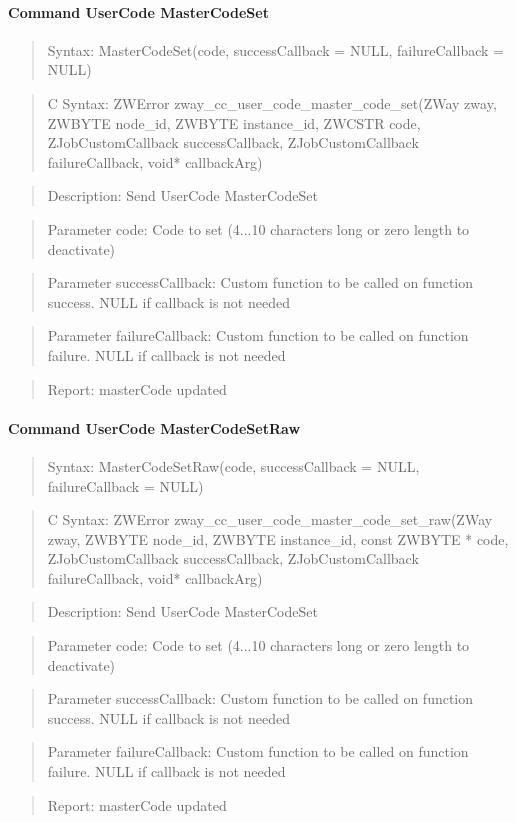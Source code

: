 \paragraph{Command UserCode MasterCodeSet}
\begin{quote}Syntax: MasterCodeSet(code, successCallback = NULL, failureCallback = NULL)\end{quote}
\begin{quote}C Syntax: ZWError zway\_cc\_user\_code\_master\_code\_set(ZWay zway, ZWBYTE node\_id, ZWBYTE instance\_id, ZWCSTR code, ZJobCustomCallback successCallback, ZJobCustomCallback failureCallback, void* callbackArg)\end{quote}
\begin{quote}Description: Send UserCode MasterCodeSet\end{quote}
\begin{quote}Parameter code: Code to set (4...10 characters long or zero length to deactivate)\end{quote}
\begin{quote}Parameter successCallback: Custom function to be called on function success. NULL if callback is not needed\end{quote}
\begin{quote}Parameter failureCallback: Custom function to be called on function failure. NULL if callback is not needed\end{quote}
\begin{quote}Report: masterCode updated\end{quote}

\paragraph{Command UserCode MasterCodeSetRaw}
\begin{quote}Syntax: MasterCodeSetRaw(code, successCallback = NULL, failureCallback = NULL)\end{quote}
\begin{quote}C Syntax: ZWError zway\_cc\_user\_code\_master\_code\_set\_raw(ZWay zway, ZWBYTE node\_id, ZWBYTE instance\_id, const ZWBYTE * code, ZJobCustomCallback successCallback, ZJobCustomCallback failureCallback, void* callbackArg)\end{quote}
\begin{quote}Description: Send UserCode MasterCodeSet\end{quote}
\begin{quote}Parameter code: Code to set (4...10 characters long or zero length to deactivate)\end{quote}
\begin{quote}Parameter successCallback: Custom function to be called on function success. NULL if callback is not needed\end{quote}
\begin{quote}Parameter failureCallback: Custom function to be called on function failure. NULL if callback is not needed\end{quote}
\begin{quote}Report: masterCode updated\end{quote}

